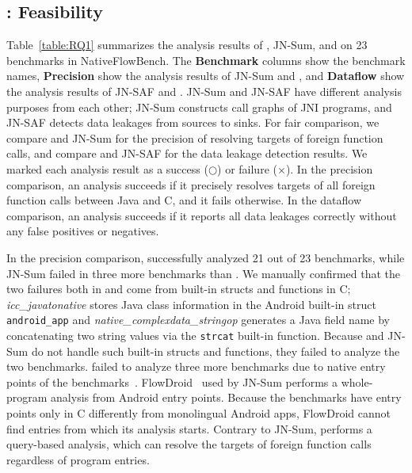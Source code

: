 \subsection{: Feasibility}
Table~\ref{table:RQ1} summarizes the analysis results of \ours, JN-Sum,
and \jnsaf on 23 benchmarks in NativeFlowBench.
The {\bf Benchmark} columns show the benchmark names,
{\bf Precision} show the analysis results of 
JN-Sum and \ours, and {\bf Dataflow} show the analysis results of JN-SAF and \ours.
JN-Sum and JN-SAF have different analysis purposes from
each other; JN-Sum constructs call graphs of JNI programs, and JN-SAF
detects data leakages from sources to sinks.  For fair comparison, we compare
\ours and JN-Sum for the precision of resolving targets of foreign
function calls, and compare \ours and JN-SAF for the data leakage detection results.
We marked each analysis result as a success ($\bigcirc$) or failure ($\times$).
In the precision comparison, an analysis succeeds if
it precisely resolves targets of all foreign function calls between Java and C, and it fails otherwise.
In the dataflow comparison, an analysis succeeds
if it reports all data leakages correctly without any false positives or negatives.


In the precision comparison, \ours successfully analyzed 21 out of 23
benchmarks, while JN-Sum failed in three more benchmarks than \ours.
We manually confirmed that the two failures both in \lees and \ours
come from built-in structs and functions in C; {\it
icc\_javatonative} stores Java class information in the Android built-in
struct {\tt android\_app} and {\it native\_complexdata\_stringop} generates
a Java field name by concatenating two string values via the {\tt strcat} built-in function.
  Because \ours and JN-Sum do not handle such built-in
structs and functions, they failed to analyze the two benchmarks.
  \lees failed to analyze three more benchmarks due to native entry points
of the benchmarks~\cite{nativeactivity}.
  FlowDroid~\cite{Flowdroid} used by JN-Sum performs a whole-program
analysis from Android entry points. 
  Because the benchmarks have entry points only in C differently from monolingual
Android apps, FlowDroid cannot find entries from which its analysis starts.
  Contrary to JN-Sum, \ours performs a query-based
analysis, which can resolve the targets of foreign function calls regardless of program entries.



